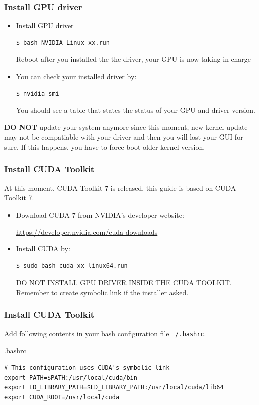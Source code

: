 \documentclass{beamer}
\begin{document}
\begin{frame}[fragile]
\frametitle{Install GPU driver}

\begin{itemize}
\item[\ding{43}] Install GPU driver
\begin{verbatim}
$ bash NVIDIA-Linux-xx.run
\end{verbatim}
Reboot after you installed the the driver, your GPU is now taking in charge

\item[\ding{43}] You can check your installed driver by:
\begin{verbatim}
$ nvidia-smi
\end{verbatim}
You should see a table that states the status of your GPU and driver version.
\end{itemize}

\textbf{DO NOT} update your system anymore since this moment, new kernel update may not be compatiable with your driver and then you will lost your GUI for sure. If this happens, you have to force boot older kernel version.
\end{frame}

\begin{frame}[fragile]
\frametitle{Install CUDA Toolkit}

At this moment, CUDA Toolkit 7 is released, this guide is based on CUDA Toolkit 7.

\begin{itemize}
\item[\ding{43}] Download CUDA 7 from NVIDIA's developer website:

\url{https://developer.nvidia.com/cuda-downloads}

\item[\ding{43}] Install CUDA by:
\begin{verbatim}
$ sudo bash cuda_xx_linux64.run
\end{verbatim}
DO NOT INSTALL GPU DRIVER INSIDE THE CUDA TOOLKIT. Remember to create symbolic link if the installer asked.

\end{itemize}

\end{frame}

\begin{frame}[fragile]
\frametitle{Install CUDA Toolkit}

Add following contents in your bash configuration file \texttt{~/.bashrc}.
\small
\begin{block}{.bashrc}
\begin{verbatim}
# This configuration uses CUDA's symbolic link
export PATH=$PATH:/usr/local/cuda/bin
export LD_LIBRARY_PATH=$LD_LIBRARY_PATH:/usr/local/cuda/lib64
export CUDA_ROOT=/usr/local/cuda
\end{verbatim}
\end{block}

\end{frame}
\end{document}
